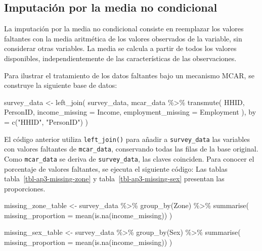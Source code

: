 \documentclass[
  spanish,
  11pt,
  letterpaper,
  oneside,
  open=any]{scrbook}
\newenvironment{Shaded}{\begin{snugshade}}{\end{snugshade}}
\newcommand{\AttributeTok}[1]{\textcolor[rgb]{0.40,0.45,0.13}{#1}}
\newcommand{\FunctionTok}[1]{\textcolor[rgb]{0.28,0.35,0.67}{#1}}
\newcommand{\NormalTok}[1]{\textcolor[rgb]{0.00,0.23,0.31}{#1}}
\newcommand{\OtherTok}[1]{\textcolor[rgb]{0.00,0.23,0.31}{#1}}
\newcommand{\SpecialCharTok}[1]{\textcolor[rgb]{0.37,0.37,0.37}{#1}}
\newcommand{\StringTok}[1]{\textcolor[rgb]{0.13,0.47,0.30}{#1}}
\begin{document}
\subsection{Imputación por la media no
condicional}\label{imputaciuxf3n-por-la-media-no-condicional}

La imputación por la media no condicional consiste en reemplazar los
valores faltantes con la media aritmética de los valores observados de
la variable, sin considerar otras variables. La media se calcula a
partir de todos los valores disponibles, independientemente de las
características de las observaciones.

Para ilustrar el tratamiento de los datos faltantes bajo un mecanismo
MCAR, se construye la siguiente base de datos:

\begin{Shaded}
\begin{Highlighting}[]
\NormalTok{survey\_data }\OtherTok{\textless{}{-}} \FunctionTok{left\_join}\NormalTok{(}
\NormalTok{  survey\_data,}
\NormalTok{  mcar\_data }\SpecialCharTok{\%\textgreater{}\%}
    \FunctionTok{transmute}\NormalTok{(}
\NormalTok{      HHID,}
\NormalTok{      PersonID,}
      \AttributeTok{income\_missing =}\NormalTok{ Income,}
      \AttributeTok{employment\_missing =}\NormalTok{ Employment}
\NormalTok{    ),}
  \AttributeTok{by =} \FunctionTok{c}\NormalTok{(}\StringTok{"HHID"}\NormalTok{, }\StringTok{"PersonID"}\NormalTok{)}
\NormalTok{)}
\end{Highlighting}
\end{Shaded}

El código anterior utiliza \texttt{left\_join()} para añadir a
\texttt{survey\_data} las variables con valores faltantes de
\texttt{mcar\_data}, conservando todas las filas de la base original.
Como \texttt{mcar\_data} se deriva de \texttt{survey\_data}, las claves
coinciden. Para conocer el porcentaje de valores faltantes, se ejecuta
el siguiente código: Las tablas tabla~\ref{tbl-ap3-missing-zone} y
tabla~\ref{tbl-ap3-missing-sex} presentan las proporciones.

\begin{Shaded}
\begin{Highlighting}[]
\NormalTok{missing\_zone\_table }\OtherTok{\textless{}{-}}\NormalTok{ survey\_data }\SpecialCharTok{\%\textgreater{}\%}
  \FunctionTok{group\_by}\NormalTok{(Zone) }\SpecialCharTok{\%\textgreater{}\%}
  \FunctionTok{summarise}\NormalTok{(}
    \AttributeTok{missing\_proportion =} \FunctionTok{mean}\NormalTok{(}\FunctionTok{is.na}\NormalTok{(income\_missing))}
\NormalTok{  )}

\NormalTok{missing\_sex\_table }\OtherTok{\textless{}{-}}\NormalTok{ survey\_data }\SpecialCharTok{\%\textgreater{}\%}
  \FunctionTok{group\_by}\NormalTok{(Sex) }\SpecialCharTok{\%\textgreater{}\%}
  \FunctionTok{summarise}\NormalTok{(}
    \AttributeTok{missing\_proportion =} \FunctionTok{mean}\NormalTok{(}\FunctionTok{is.na}\NormalTok{(income\_missing))}
\NormalTok{  )}
\end{Highlighting}
\end{Shaded}
\end{document}
